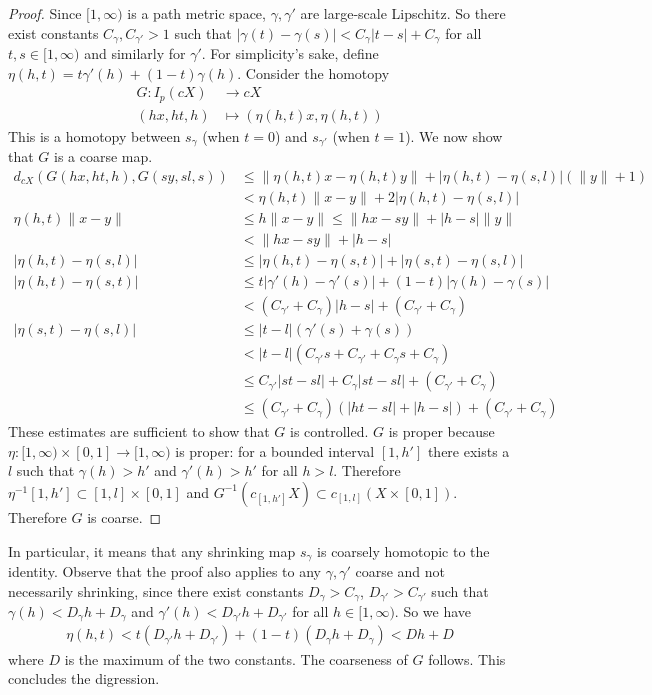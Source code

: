 \documentclass[a4paper,11pt]{article}
\theoremstyle{definition}
\theoremstyle{plain}
\theoremstyle{remark}
\begin{document}
\begin{proof}
 Since $[1,\infty)$ is a path metric space, $\gamma,\gamma'$ are large-scale Lipschitz. So there exist constants $C_{\gamma}, C_{\gamma'}>1$ such that $|\gamma(t)-\gamma(s)|<C_{\gamma}|t-s|+C_{\gamma}$ for all $t,s\in [1,\infty)$ and similarly for $\gamma'$. For simplicity's sake, define $\eta(h,t) = t \gamma'(h) + (1-t) \gamma(h)$. Consider the homotopy
\begin{align*}
G: I_{p}(cX)&\longrightarrow cX
\\ (hx,ht,h) &\longmapsto (\eta(h,t)x, \eta(h,t))
\end{align*}
This is a homotopy between $s_{\gamma}$ (when $t=0$) and $s_{\gamma'}$ (when $t=1$). We now show that $G$ is a coarse map. 
\begin{align*}
d_{cX}(G(hx,ht,h), G(sy,sl,s)) &\leq \|\eta(h,t)x-\eta(h,t)y\|+ |\eta(h,t)-\eta(s,l)| (\|y\| +1)\\
&< \eta(h,t)\|x-y\| + 2|\eta(h,t)-\eta(s,l)|\\
 \eta(h,t)\|x-y\|  &\leq  h\|x-y\| \leq \|hx-sy\|+|h-s|\|y\| \\
 &< \|hx-sy\|+|h-s|\\
 |\eta(h,t)-\eta(s,l)| &\leq |\eta(h,t)-\eta(s,t)| + |\eta(s,t)- \eta(s,l)|\\
|\eta(h,t)-\eta(s,t)| &\leq t|\gamma'(h) - \gamma'(s)| + (1-t) |\gamma(h) - \gamma(s)|\\
&<(C_{\gamma'}+ C_{\gamma})|h-s| + (C_{\gamma'}+ C_{\gamma})\\
|\eta(s,t)- \eta(s,l)| &\leq |t-l|(\gamma'(s) + \gamma(s))\\
&<|t-l|(C_{\gamma'}s + C_{\gamma'} + C_{\gamma}s +C_{\gamma})\\
&\leq C_{\gamma'}|st-sl| + C_{\gamma}|st-sl|+(C_{\gamma'} + C_{\gamma})\\
& \leq (C_{\gamma'}+ C_{\gamma})(|ht-sl| +|h-s|) + (C_{\gamma'} + C_{\gamma})
\end{align*}
These estimates are sufficient to show that $G$ is controlled. $G$ is proper because $\eta: [1,\infty) \times [0,1]\rightarrow [1,\infty)$ is proper: for a bounded interval $[1,h']$ there exists a $l$ such that $\gamma(h)>h'$ and $\gamma'(h)>h'$ for all $h>l$. Therefore $\eta^{-1}[1,h'] \subset [1,l] \times [0,1]$ and $G^{-1}(c_{[1,h']}X) \subset  c_{[1,l]}(X \times [0,1])$. Therefore $G$ is coarse.  
\end{proof}

In particular, it means that any shrinking map $s_{\gamma}$ is coarsely homotopic to the identity. Observe that the proof also applies to any $\gamma,\gamma'$ coarse and not necessarily shrinking, since there exist constants $D_{\gamma}>C_{\gamma}$, $D_{\gamma'}>C_{\gamma'}$ such that $\gamma(h)< D_{\gamma}h + D_{\gamma}$ and $\gamma'(h)< D_{\gamma'} h+ D_{\gamma'}$ for all $h\in [1,\infty)$. So we have 
\begin{align*}
\eta(h,t) < t (D_{\gamma'}h + D_{\gamma'}) + (1-t)(D_{\gamma}h+D_{\gamma}) < Dh + D
\end{align*} 
where $D$ is the maximum of the two constants. The coarseness of $G$ follows. This concludes the digression. \\
\end{document}
